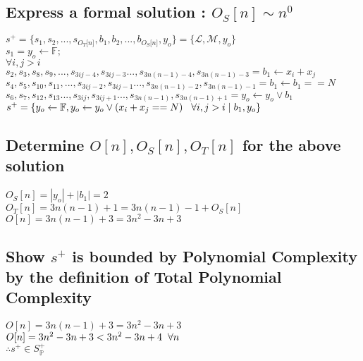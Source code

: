 \documentclass[11pt]{article}
\begin{document}
\subsection{Express a formal solution : $O_S[n] \sim n^0$}
\begin{center}
\vspace{1.5mm}
$
s^+ = \{ s_1,s_2,...,s_{O_T \lbrack n \rbrack }, b_1, b_2,...,b_{O_S \lbrack n \rbrack},y_o \} = \{ \mathcal{L},\mathcal{M},y_o\}
$
\\ \vspace{2mm}
$
s_1 = y_o \leftarrow \mathbb{F};
$
\\ \vspace{2mm}
$
\forall i,j > i
$
\\ \vspace{2mm}
$
s_2,s_3,s_8,s_9,...,s_{3ij-4},s_{3ij-3}...,s_{3n(n-1)-4},s_{3n(n-1)-3} =  b_1 \leftarrow x_i + x_j 
$
\\ \vspace{2mm}
$
s_4,s_5,s_{10},s_{11},...,s_{3ij-2},s_{3ij-1}...,s_{3n(n-1)-2},s_{3n(n-1)-1} = b_1 \leftarrow b_1 == N
$
\\ \vspace{2mm}
$
s_6,s_7,s_{12},s_{13}...,s_{3ij},s_{3ij+1}...,s_{3n(n-1)},s_{3n(n-1)+1} = y_o \leftarrow y_o \lor b_1
$
\\ \vspace{2mm}
$
s^+ = \{y_o \leftarrow \mathbb{F},y_o \leftarrow y_o \lor (x_i + x_j == N) \hspace{3mm} \forall i,j > i \hspace{1mm}| \hspace{1mm} b_1,y_o\}
$
\end{center}

\subsection{Determine $O[n], O_S[n], O_T[n]$ for the above solution}
\begin{center}
$
O_S[n] = |y_o| + |b_1| = 2
$
\\ \vspace{2mm}
$
O_T[n] = 3n(n-1) + 1 = 3n(n-1) -1 + O_S[n]
$
\\ \vspace{2mm}
$
O[n] = 3n(n-1) + 3 = 3n^2 -3n + 3
$
\end{center}

\subsection{Show $s^+$ is bounded by Polynomial Complexity by the definition of Total Polynomial Complexity}
\begin{center}
$
O[n] = 3n(n-1) + 3 = 3n^2 -3n + 3
$
\\ \vspace{2mm}
$
O[n] = 3n^2 -3n + 3 < 3n^2 -3n +4 \hspace{2mm} \forall n
$
\\ \vspace{2mm}
$
\therefore s^+ \in S^+_{\mathbb{P}}
$
\end{center}
\end{document}
